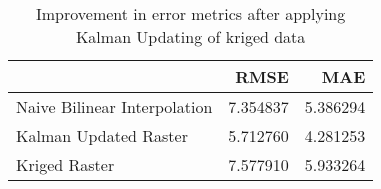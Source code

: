 \begin{table}
\caption{Improvement in error metrics after applying Kalman Updating of kriged data}
\label{tab:charlotteamalie_gebco_raster_error}
\begin{tabular}{lrr}
\toprule
 & RMSE & MAE \\
\midrule
Naive Bilinear Interpolation & 7.354837 & 5.386294 \\
Kalman Updated Raster & 5.712760 & 4.281253 \\
Kriged Raster & 7.577910 & 5.933264 \\
\bottomrule
\end{tabular}
\end{table}
